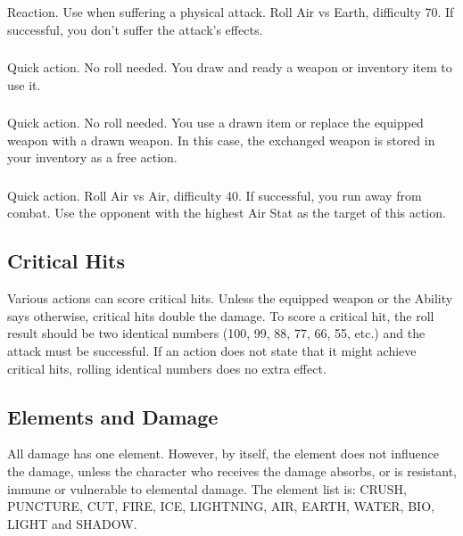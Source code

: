 \begin{multicols}{2}
\subsubsection{}
Reaction. Use when suffering a physical attack. Roll Air vs Earth, difficulty 70. If successful, you don’t suffer the attack’s effects.

\subsubsection{}
Quick action. No roll needed. You draw and ready a weapon or inventory item to use it.

\subsubsection{}
Quick action. No roll needed. You use a drawn item or replace the equipped weapon with a drawn weapon. In this case, the exchanged weapon is stored in your inventory as a free action.

\subsubsection{}
Quick action. Roll Air vs Air, difficulty 40. If successful, you run away from combat. Use the opponent with the highest Air Stat as the target of this action.

\subsection{Critical Hits}
Various actions can score critical hits. Unless the equipped weapon or the Ability says otherwise, critical hits double the damage. To score a critical hit, the roll result should be two identical numbers (100, 99, 88, 77, 66, 55, etc.) and the attack must be successful. If an action does not state that it might achieve critical hits, rolling identical numbers does no extra effect.

\begin{center}
\end{center}

\subsection{Elements and Damage}
All damage has one element. However, by itself, the element does not influence the damage, unless the character who receives the damage absorbs, or is resistant, immune or vulnerable to elemental damage. The element list is: CRUSH, PUNCTURE, CUT, FIRE, ICE, LIGHTNING, AIR, EARTH, WATER, BIO, LIGHT and SHADOW\@. %


\end{multicols}
